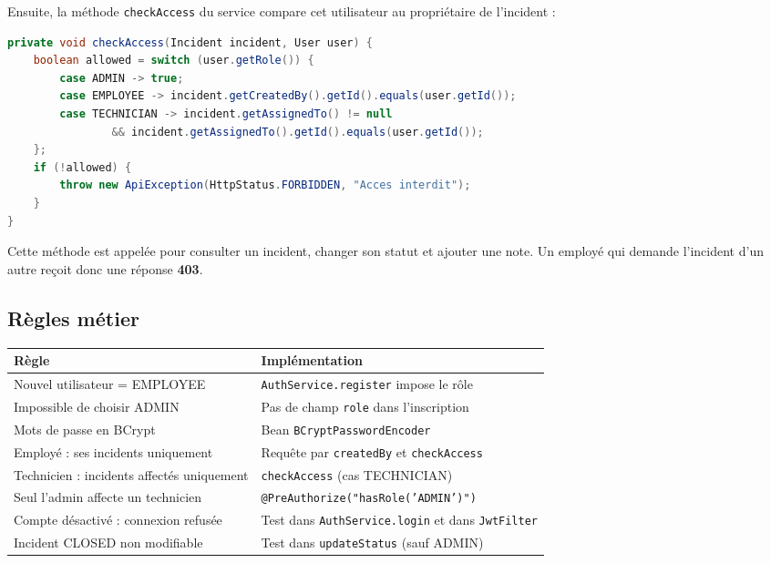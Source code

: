 \documentclass{rapportENSET}
\begin{document}
Ensuite, la m\'ethode \texttt{checkAccess} du service compare cet utilisateur au propri\'etaire de l'incident :

\begin{lstlisting}[language=Java]
private void checkAccess(Incident incident, User user) {
    boolean allowed = switch (user.getRole()) {
        case ADMIN -> true;
        case EMPLOYEE -> incident.getCreatedBy().getId().equals(user.getId());
        case TECHNICIAN -> incident.getAssignedTo() != null
                && incident.getAssignedTo().getId().equals(user.getId());
    };
    if (!allowed) {
        throw new ApiException(HttpStatus.FORBIDDEN, "Acces interdit");
    }
}
\end{lstlisting}

Cette m\'ethode est appel\'ee pour consulter un incident, changer son statut et ajouter une note. Un employ\'e qui demande l'incident d'un autre re\c{c}oit donc une r\'eponse \textbf{403}.

\subsection{R\`egles m\'etier}

\begin{center}
\begin{tabular}{p{7.5cm}p{7cm}}
\toprule
\textbf{R\`egle} & \textbf{Impl\'ementation} \\
\midrule
Nouvel utilisateur = EMPLOYEE & \texttt{AuthService.register} impose le r\^ole \\
Impossible de choisir ADMIN & Pas de champ \texttt{role} dans l'inscription \\
Mots de passe en BCrypt & Bean \texttt{BCryptPasswordEncoder} \\
Employ\'e : ses incidents uniquement & Requ\^ete par \texttt{createdBy} et \texttt{checkAccess} \\
Technicien : incidents affect\'es uniquement & \texttt{checkAccess} (cas TECHNICIAN) \\
Seul l'admin affecte un technicien & \texttt{@PreAuthorize("hasRole('ADMIN')")} \\
Compte d\'esactiv\'e : connexion refus\'ee & Test dans \texttt{AuthService.login} et dans \texttt{JwtFilter} \\
Incident CLOSED non modifiable & Test dans \texttt{updateStatus} (sauf ADMIN) \\
\bottomrule
\end{tabular}
\end{center}
\end{document}
